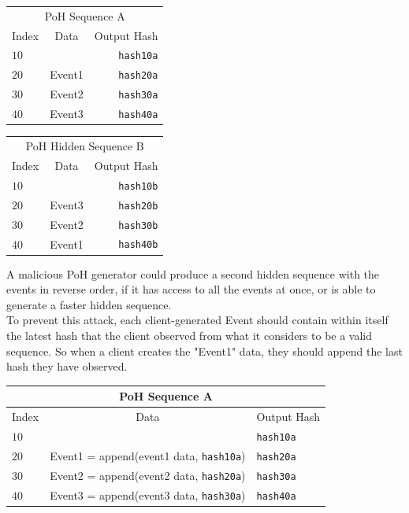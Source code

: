 \documentclass[12pt]{article}
\begin{document}
\begin{center}
  \begin{tabular}{ | l c r |}
    \hline
    \multicolumn{3}{|c|}{PoH Sequence A} \\
    Index & Data & Output Hash  \\ \hline
    $10$ & & \texttt{hash10a} \\
    $20$ & Event1 & \texttt{hash20a} \\
    $30$ & Event2 & \texttt{hash30a} \\
    $40$ & Event3 & \texttt{hash40a} \\
    \hline
    \end{tabular}
  \begin{tabular}{ | l c r |}
    \hline
    \multicolumn{3}{|c|}{PoH Hidden Sequence B} \\
    Index & Data & Output Hash \\ \hline
    $10$ & & \texttt{hash10b}\\
    $20$ & Event3 & \texttt{hash20b}  \\
    $30$ & Event2 & \texttt{hash30b} \\
    $40$ & Event1 & \texttt{hash40b} \\
    \hline
    \end{tabular}
\end{center}

A malicious PoH generator could produce a second hidden sequence with the events in reverse order, if it has access to all the events at once, or is able to generate a faster hidden sequence.\\

To prevent this attack, each client-generated Event should contain within itself the latest hash that the client observed from what it considers to be a valid sequence. So when a client creates the "Event1" data, they should append the last hash they have observed.\\

\begin{center}
  \begin{tabular}{  l  c l}

    \multicolumn{3}{c}{PoH Sequence A} \\
    \hline
    Index  & Data & Output Hash  \\ \hline
    $10$ & & \texttt{hash10a} \\
    $20$ & Event1 = append(event1 data, \texttt{hash10a}) & \texttt{hash20a}  \\
    $30$ & Event2 = append(event2 data, \texttt{hash20a}) & \texttt{hash30a} \\
    $40$ &  Event3 = append(event3 data, \texttt{hash30a}) & \texttt{hash40a} \\
    \end{tabular}
\end{center}
\end{document}
